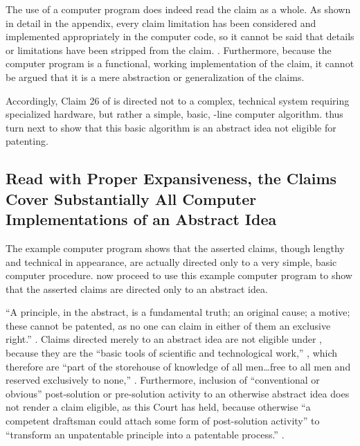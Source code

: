 \documentclass{scotus}
\begin{document}
The use of a computer program does
indeed read the claim as a whole. As shown in detail in the appendix, every
claim limitation has been considered and implemented appropriately in the
computer code, so it cannot be said that details or limitations have been
stripped from the claim. . Furthermore,
because
the computer program is a functional, working implementation of the claim, it
cannot be argued that it is a mere abstraction or generalization of the claims.

Accordingly, Claim 26 of  is directed not to a complex, technical
system requiring specialized hardware, but rather a simple, basic,
\numlines-line computer algorithm. \Amici thus turn next to show that this
basic algorithm is an abstract idea not eligible for patenting.

\subsection{Read with Proper Expansiveness, the Claims Cover Substantially All
Computer Implementations of an Abstract Idea}

The example computer program shows that the asserted claims, though lengthy and
technical in appearance, are actually directed only to a very simple, basic
computer procedure. \Amici now proceed to use this example computer program to
show that the asserted claims are directed only to an abstract idea.

``A principle, in the abstract, is a fundamental truth; an original cause; a
motive; these cannot be patented, as no one can claim in either of them an
exclusive right.'' .
Claims directed merely to an abstract idea are
not eligible under , because they are the ``basic tools of
scientific and technological work,'' , which therefore
are ``part of the storehouse of knowledge of all men\ldots free to all men and
reserved exclusively to none,'' . Furthermore, inclusion of ``conventional or
obvious''
post-solution or pre-solution activity to an otherwise abstract idea does not
render a claim eligible, as this Court has held, because otherwise
``a competent draftsman could attach some form of post-solution activity'' to
``transform an unpatentable principle into a patentable process.''
.
\end{document}
